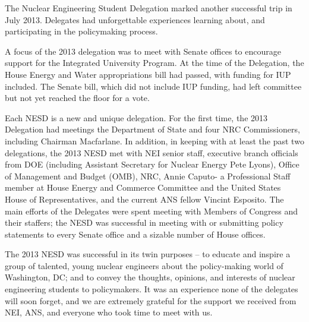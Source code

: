 
The Nuclear Engineering Student Delegation marked another successful trip in
July 2013.  Delegates had unforgettable experiences learning about, and
participating in the policymaking process.

A focus of the 2013 delegation was to meet with Senate offices to encourage
support for the Integrated University Program.  At the time of the Delegation,
the House Energy and Water appropriations bill had passed, with funding for IUP
included.  The Senate bill, which did not include IUP funding, had left
committee but not yet reached the floor for a vote.

Each NESD is a new and unique delegation. For the first time, the 2013
Delegation had meetings the Department of State and four NRC Commissioners,
including Chairman Macfarlane.  In addition, in keeping with at least the past
two delegations, the 2013 NESD met with NEI senior staff, executive branch
officials from DOE (including Assistant Secretary for Nuclear Energy Pete
Lyons), Office of Management and Budget (OMB), NRC, Annie Caputo- a Professional
Staff member at House Energy and Commerce Committee and the United States House
of Representatives, and the current ANS fellow Vincint Esposito.  The main
efforts of the Delegates were spent meeting with Members of Congress and their
staffers; the NESD was successful in meeting with or submitting policy
statements to every Senate office and a sizable number of House offices.

The 2013 NESD was successful in its twin purposes – to educate and inspire a
group of talented, young nuclear engineers about the policy-making world of
Washington, DC; and to convey the thoughts, opinions, and interests of nuclear
engineering students to policymakers.  It was an experience none of the
delegates will soon forget, and we are extremely grateful for the support we
received from NEI, ANS, and everyone who took time to meet with us.
